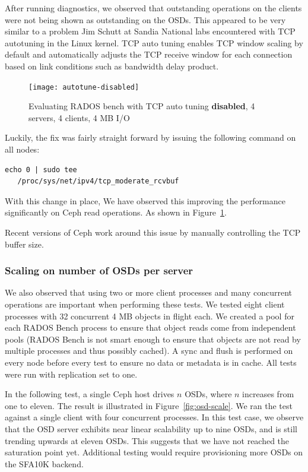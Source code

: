 After running diagnostics, we observed that outstanding operations on the
clients were not being shown as outstanding on the OSDs.  This appeared to be
very similar to a problem Jim Schutt at Sandia National labs encountered with
TCP autotuning in the Linux
kernel\cite{Jim:tcptune}.
TCP auto tuning enables TCP window scaling by default and automatically adjusts
the TCP receive window for each connection based on link conditions such as
bandwidth delay product. 

\begin{figure}[htb]
\centering
\texttt{[image: autotune-disabled]}
\caption{Evaluating RADOS bench with TCP auto tuning \textbf{disabled},  4 servers, 4
clients, 4 MB I/O}
\label{fig:rados-tcp-autotune-disabled}
\end{figure}


Luckily, the fix was fairly straight forward by issuing the following command
on all nodes:

\begin{Verbatim}[fontsize=\small]
 echo 0 | sudo tee 
   /proc/sys/net/ipv4/tcp_moderate_rcvbuf
\end{Verbatim}

With this change in place, We have observed this improving the performance
significantly on Ceph read operations. As shown in
Figure~\ref{fig:rados-tcp-autotune-disabled}.


Recent versions of Ceph work around this issue by manually controlling the TCP
buffer size.  

\subsubsection{Scaling on number of OSDs per server}

We also observed that using two or more client processes and many concurrent
operations are important when performing these tests.  We tested eight client
processes with 32 concurrent 4 MB objects in flight each. We created a pool
for each RADOS Bench process to ensure that object reads come from independent
pools (RADOS Bench is not smart enough to ensure that objects are not read by
multiple processes and thus possibly cached).  A sync and flush is performed
on every node before every test to ensure no data or metadata is in cache.
All tests were run with replication set to one. 

In the following test, a single Ceph host drives $n$ OSDs, where $n$ increases
from one to eleven. The result is illustrated in Figure~\ref{fig:osd-scale}.
We ran the test against a single client with four concurrent processes. In this
test case, we observe that the OSD server exhibits near linear scalability up to
nine OSDs, and is still trending upwards at eleven OSDs. This suggests that we
have not reached the saturation point yet. Additional testing would require
provisioning more OSDs on the SFA10K backend.


